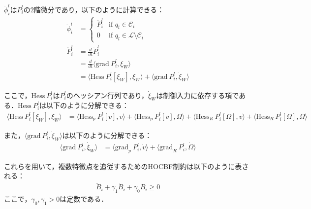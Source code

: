 $\ddot{\phi}_i^l$は$P_i^l$の2階微分であり，以下のように計算できる：
\begin{equation}
\begin{aligned}
\ddot{\phi}_i^l &= 
\begin{cases}
\ddot{P}_i^l & \text{if } q_l \in \mathcal{C}_i \\
0 & \text{if } q_l \in \mathcal{L} \setminus \mathcal{C}_i
\end{cases} \\
\ddot{P}_i^l &= \frac{d}{dt} \dot{P}_i^l \\
&= \frac{d}{dt} \langle \mathrm{grad}\:P_i^l, \xi_W \rangle \\
&= \langle \mathrm{Hess}\:P_i^l[\xi_W], \xi_W \rangle + \langle \mathrm{grad}\:P_i^l, \dot{\xi}_W \rangle
\label{eq:multi_probability_second_derivative}
\end{aligned}
\end{equation}

ここで，$\mathrm{Hess}\:P_i^l$は$P_i^l$のヘッシアン行列であり，$\dot{\xi}_W$は制御入力に依存する項である．$\mathrm{Hess}\:P_i^l$は以下のように分解できる：
\begin{equation}
\begin{aligned}
\langle \mathrm{Hess}\:P_i^l[\xi_W], \xi_W \rangle &= \langle \mathrm{Hess}_p\:P_i^l[v], v \rangle + \langle \mathrm{Hess}_p\:P_i^l[v], \Omega \rangle + \langle \mathrm{Hess}_R\:P_i^l[\Omega], v \rangle + \langle \mathrm{Hess}_R\:P_i^l[\Omega], \Omega \rangle
\label{eq:multi_hessian}
\end{aligned}
\end{equation}

また，$\langle \mathrm{grad}\:P_i^l, \dot{\xi}_W \rangle$は以下のように分解できる：
\begin{equation}
\begin{aligned}
\langle \mathrm{grad}\:P_i^l, \dot{\xi}_W \rangle &= \langle \mathrm{grad}_p\:P_i^l, \dot{v} \rangle + \langle \mathrm{grad}_R\:P_i^l, \dot{\Omega} \rangle
\label{eq:multi_grad_derivative}
\end{aligned}
\end{equation}

これらを用いて，複数特徴点を追従するためのHOCBF制約は以下のように表される：
\begin{equation}
\begin{aligned}
\ddot{B}_i + \gamma_1 \dot{B}_i + \gamma_0 B_i \geq 0
\label{eq:multi_hocbf_constraint}
\end{aligned}
\end{equation}
ここで，$\gamma_0, \gamma_1 > 0$は定数である．

